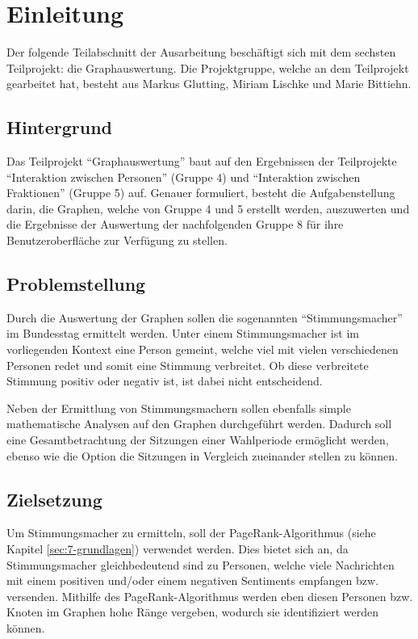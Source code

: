 \section{Einleitung}

Der folgende Teilabschnitt der Ausarbeitung beschäftigt sich mit dem sechsten Teilprojekt: die Graphauswertung. Die Projektgruppe, welche an dem Teilprojekt gearbeitet hat, besteht aus Markus Glutting, Miriam Lischke und Marie Bittiehn.

\subsection{Hintergrund}
Das Teilprojekt ``Graphauswertung'' baut auf den Ergebnissen der Teilprojekte ``Interaktion zwischen Personen'' (Gruppe 4) und ``Interaktion zwischen Fraktionen'' (Gruppe 5) auf. Genauer formuliert, besteht die Aufgabenstellung darin, die Graphen, welche von Gruppe 4 und 5 erstellt werden, auszuwerten und die Ergebnisse der Auswertung der nachfolgenden Gruppe 8 für ihre Benutzeroberfläche zur Verfügung zu stellen.

\subsection{Problemstellung}
Durch die Auswertung der Graphen sollen die sogenannten ``Stimmungsmacher'' im Bundesstag ermittelt werden. Unter einem Stimmungsmacher ist im vorliegenden Kontext eine Person gemeint, welche viel mit vielen verschiedenen Personen redet und somit eine Stimmung verbreitet. Ob diese verbreitete Stimmung positiv oder negativ ist, ist dabei nicht entscheidend.

Neben der Ermittlung von Stimmungsmachern sollen ebenfalls simple mathematische Analysen auf den Graphen durchgeführt werden. Dadurch soll eine Gesamtbetrachtung der Sitzungen einer Wahlperiode ermöglicht werden, ebenso wie die Option die Sitzungen in Vergleich zueinander stellen zu können.

\subsection{Zielsetzung}

Um Stimmungsmacher zu ermitteln, soll der PageRank-Algorithmus (siehe Kapitel \ref{sec:7-grundlagen}) verwendet werden. Dies bietet sich an, da Stimmungsmacher gleichbedeutend sind zu Personen, welche viele Nachrichten mit einem positiven und/oder einem negativen Sentiments empfangen bzw. versenden. Mithilfe des PageRank-Algorithmus werden eben diesen Personen bzw. Knoten im Graphen hohe Ränge vergeben, wodurch sie identifiziert werden können.

